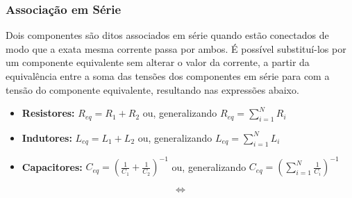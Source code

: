 \documentclass{article}
\numberwithin{equation}{section}
\newlength\Colsep
\begin{document}
\subsubsection{Associação em Série}
\label{subsubsec:serie}
Dois componentes são ditos associados em série quando estão conectados de modo que a exata mesma corrente passa por ambos. É possível substituí-los por um componente equivalente sem alterar o valor da corrente, a partir da equivalência entre a soma das tensões dos componentes em série para com a tensão do componente equivalente, resultando nas expressões abaixo.
\begin{itemize}
    \item \textbf{Resistores:} $R_{eq}= R_{1} + R_{2}$ \hspace{3.35cm}
    ou, generalizando $R_{eq}= \displaystyle{\sum_{i=1}^{N} R_{i}}$
    \item \textbf{Indutores:} $L_{eq}= L_{1} + L_{2}$ \hspace{3.5cm}
    ou, generalizando $L_{eq}= \displaystyle{\sum_{i=1}^{N} L_{i}}$
    \item \textbf{Capacitores:} $C_{eq}= \left(\displaystyle{\frac{1}{C_{1}}} + \displaystyle{\frac{1}{C_{2}}}\right)^{-1}$ \hspace{2cm}
    ou, generalizando $C_{eq}= \left(\displaystyle{\sum_{i=1}^{N} \frac{1}{C_{i}}}\right)^{-1}$
\end{itemize}

\noindent\begin{minipage}{\textwidth}
\begin{minipage}[c][2cm][c]{\dimexpr0.45\textwidth-0.5\Colsep\relax}
    \begin{center}
    \end{center}
\end{minipage} \hfill
\begin{minipage}[c][2cm][c]{\dimexpr0.1\textwidth-0.5\Colsep\relax}
    $$\iff$$
\end{minipage} \hfill
\begin{minipage}[c][2cm][c]{\dimexpr0.45\textwidth-0.5\Colsep\relax}
    \begin{center}
    \end{center}
\end{minipage}
\end{minipage}
\end{document}
